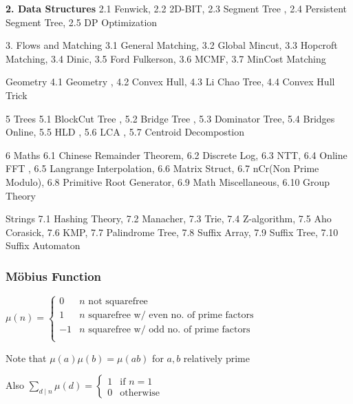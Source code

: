 \documentclass[12pt]{extarticle}
\author{
	Ayush Ranjan, Naman Jain, Manish Tanwar
}
\begin{document}
\maketitle
		\begin{multicols*}{2}
			
			\setlength{\parskip}{0.0in}
			\setlength{\parskip}{0.0in}
			
			\textbf{2. Data Structures}
			2.1 Fenwick, 2.2 2D-BIT, 2.3 Segment Tree , 2.4 Persistent Segment Tree, 2.5 DP Optimization
			
			3. Flows and Matching
			3.1 General Matching, 3.2 Global Mincut, 3.3 Hopcroft Matching, 3.4 Dinic, 3.5 Ford Fulkerson, 3.6 MCMF, 3.7 MinCost Matching
			
			Geometry
			4.1 Geometry , 4.2 Convex Hull, 4.3 Li Chao Tree, 4.4 Convex Hull Trick
			
			5 Trees
			5.1 BlockCut Tree , 5.2 Bridge Tree , 5.3 Dominator Tree, 5.4 Bridges Online, 5.5 HLD , 5.6 LCA , 5.7 Centroid Decompostion
			
			6 Maths
			6.1 Chinese Remainder Theorem, 6.2 Discrete Log, 6.3 NTT, 6.4 Online FFT , 6.5 Langrange Interpolation, 6.6 Matrix Struct, 6.7 nCr(Non Prime Modulo), 6.8 Primitive Root Generator, 6.9 Math Miscellaneous, 6.10 Group Theory
			
			Strings
			7.1 Hashing Theory, 7.2 Manacher, 7.3 Trie, 7.4 Z-algorithm, 7.5 Aho Corasick, 7.6 KMP, 7.7 Palindrome Tree, 7.8 Suffix Array, 7.9 Suffix Tree, 7.10 Suffix Automaton
			
						
			\subsubsection*{M\"obius Function} %
			$\mu(n) = \begin{cases}
			0 & \text{$n$ not squarefree} \\
			1 & \text{$n$ squarefree w/ even no. of prime factors} \\
			-1 & \text{$n$ squarefree w/ odd no. of prime factors} \\
			\end{cases}$
			\par
			Note that $\mu(a) \mu(b) = \mu(ab)$ for $a, b$ relatively prime
			\par
			Also $\sum_{d \mid n} \mu(d) = \begin{cases} 1 & \text{if $n = 1$} \\
			0 & \text{otherwise} \end{cases}$
			

\end{multicols*}
\end{document}
